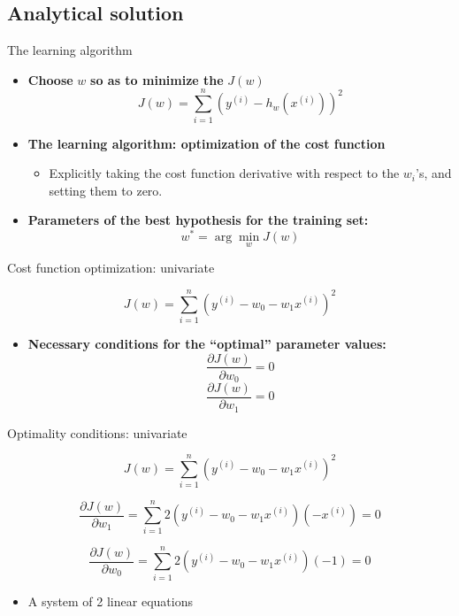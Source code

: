 \documentclass[serif, aspectratio=169]{beamer}
\begin{document}
\subsection{Analytical solution}
\begin{frame}{The learning algorithm}

\begin{itemize}
    \item \textbf{Choose} \( w \) \textbf{so as to minimize the} \( J(w) \)
    \[
    J(w) = \sum_{i=1}^{n} \left( y^{(i)} - h_w(x^{(i)}) \right)^2
    \]
    
    \item \textbf{The learning algorithm: optimization of the cost function}
    \begin{itemize}
        \item Explicitly taking the cost function derivative with respect to the \( w_i \)'s, and setting them to zero.
    \end{itemize}
    
    \item \textbf{Parameters of the best hypothesis for the training set:}
    \[
    w^* = \arg \min_{w} J(w)
    \]
\end{itemize}
\end{frame}


\begin{frame}{Cost function optimization: univariate}

\[
J(w) = \sum_{i=1}^{n} \left( y^{(i)} - w_0 - w_1 x^{(i)} \right)^2
\]

\begin{itemize}
    \item \textbf{Necessary conditions for the “optimal” parameter values:}
    \[
    \frac{\partial J(w)}{\partial w_0} = 0
    \]
    \[
    \frac{\partial J(w)}{\partial w_1} = 0
    \]
\end{itemize}

\end{frame}


\begin{frame}{Optimality conditions: univariate}

\[
J(w) = \sum_{i=1}^{n} \left( y^{(i)} - w_0 - w_1 x^{(i)} \right)^2
\]

\[
\frac{\partial J(w)}{\partial w_1} = \sum_{i=1}^{n} 2 \left( y^{(i)} - w_0 - w_1 x^{(i)} \right) (-x^{(i)}) = 0
\]

\[
\frac{\partial J(w)}{\partial w_0} = \sum_{i=1}^{n} 2 \left( y^{(i)} - w_0 - w_1 x^{(i)} \right) (-1) = 0
\]

\begin{itemize}
    \item A system of 2 linear equations
\end{itemize}

\end{frame}
\end{document}
